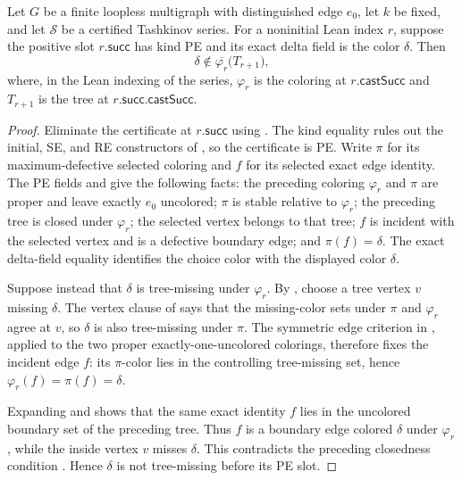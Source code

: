 \begin{helper}
Let \(G\) be a finite loopless multigraph with distinguished edge \(e_0\),
let \(k\) be fixed, and let \(\mathcal S\) be a certified Tashkinov series.
For a noninitial Lean index \(r\), suppose the positive slot
\(r.\mathsf{succ}\) has kind PE and its exact delta field is the color
\(\delta\).  Then
\[
 \delta\notin
 \overline{\varphi_r}\bigl(T_{r+1}\bigr),
\]
where, in the Lean indexing of the series, \(\varphi_r\) is the coloring at
\(r.\mathsf{castSucc}\) and \(T_{r+1}\) is the tree at
\(r.\mathsf{succ}.\mathsf{castSucc}\).
\end{helper}
\begin{proof}
Eliminate the certificate at \(r.\mathsf{succ}\) using
.  The kind equality rules out the initial, SE, and
RE constructors of , so the certificate is PE.
Write \(\pi\) for its maximum-defective selected coloring and \(f\) for its
selected exact edge identity.  The PE fields and
 give the following facts: the preceding
coloring \(\varphi_r\) and \(\pi\) are proper and leave exactly \(e_0\)
uncolored; \(\pi\) is stable relative to \(\varphi_r\); the preceding tree
is closed under \(\varphi_r\); the selected vertex belongs to that tree;
\(f\) is incident with the selected vertex and is a defective boundary edge;
and \(\pi(f)=\delta\).  The exact delta-field equality identifies the
choice color with the displayed color \(\delta\).

Suppose instead that \(\delta\) is tree-missing under \(\varphi_r\).
By , choose a tree vertex \(v\) missing
\(\delta\).  The vertex clause of  says that the
missing-color sets under \(\pi\) and \(\varphi_r\) agree at \(v\), so
\(\delta\) is also tree-missing under \(\pi\).  The symmetric edge criterion
in , applied to the two proper exactly-one-uncolored colorings,
therefore fixes the incident edge \(f\): its \(\pi\)-color lies in the
controlling tree-missing set, hence
\(\varphi_r(f)=\pi(f)=\delta\).

Expanding  and
 shows that the same exact identity \(f\) lies
in the uncolored boundary set  of the preceding tree.
Thus \(f\) is a boundary edge colored \(\delta\) under \(\varphi_r\), while
the inside vertex \(v\) misses \(\delta\).  This contradicts the preceding
closedness condition .  Hence \(\delta\) is
not tree-missing before its PE slot.
\end{proof}
